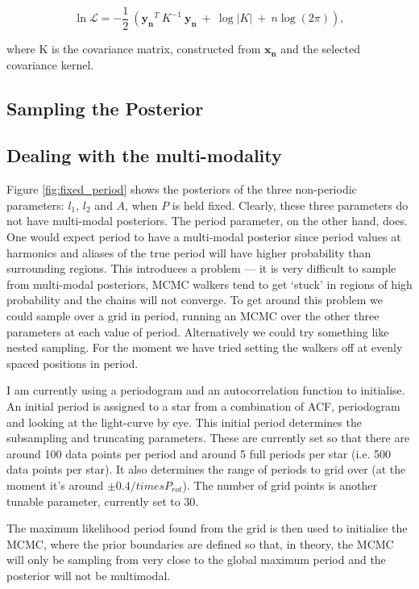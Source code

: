 \documentclass[12pt,preprint]{aastex}
\begin{document}
\begin{equation}
	\ln{\mathcal{L}} = -\frac{1}{2}~\left(\mathbf{y_n}^T~K^{-1}~\mathbf{y_n}~ + ~\log{|K| ~+~ n\log(2\pi)} \right),
\end{equation}

where K is the covariance matrix, constructed from $\mathbf{x_n}$ and the selected covariance kernel.

\subsection{Sampling the Posterior}

\subsection{Dealing with the multi-modality}

Figure \ref{fig:fixed_period} shows the posteriors of the three non-periodic parameters: $l_1$, $l_2$ and $A$, when $P$ is held fixed.
Clearly, these three parameters do not have multi-modal posteriors.
The period parameter, on the other hand, does.
One would expect period to have a multi-modal posterior since period values at harmonics and aliases of the true period will have higher probability than surrounding regions.
This introduces a problem --- it is very difficult to sample from multi-modal posteriors, MCMC walkers tend to get `stuck' in regions of high probability and the chains will not converge.
To get around this problem we could sample over a grid in period, running an MCMC over the other three parameters at each value of period.
Alternatively we could try something like nested sampling.
For the moment we have tried setting the walkers off at evenly spaced positions in period.

I am currently using a periodogram and an autocorrelation function to initialise.
An initial period is assigned to a star from a combination of ACF, periodogram and looking at the light-curve by eye.
This initial period determines the subsampling and truncating parameters.
These are currently set so that there are around 100 data points per period and around 5 full periods per star (i.e. 500 data points per star).
It also determines the range of periods to grid over (at the moment it's around $\pm 0.4 /times P_{rot}$).
The number of grid points is another tunable parameter, currently set to 30.

The maximum likelihood period found from the grid is then used to initialise the MCMC, where the prior boundaries are defined so that, in theory, the MCMC will only be sampling from very close to the global maximum period and the posterior will not be multimodal.
\end{document}
